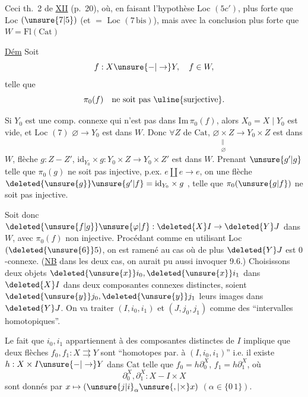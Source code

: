 

Ceci  th.~2 de \uline{XII} (p.~20),  où, en faisant l'hypothèse Loc $(5c')$, plus forte que Loc $(\unsure{7|5})$ (et $=$ Loc $(7\,\mathrm{bis})$), mais avec la conclusion plus forte que $W=\mathrm{Fl}(\mathrm{Cat})$

\uline{Dém} Soit
\[
 f:X\unsure{-|\to}Y,\quad f\in W,
\]
telle que
\[
 \pi_0(f)\quad\text{ne soit pas \uline{surjective}.}
\]

 Si $Y_0$ est une comp. connexe qui n'est pas dans $\mathrm{Im}\,\pi_0(f)$, alors $X_0=X\mid Y_0$ est vide, et  Loc $(7)$ $\varnothing\to Y_0$ est dans $W$. Donc $\forall Z$ de $\mathrm{Cat}$, $\underset{\substack{\|\\\varnothing}}{\varnothing\times Z}\longrightarrow Y_0\times Z$ est dans $W$,   flèche $g:Z-Z'$, $\mathrm{id}_{Y_0}\times g:Y_0\times Z\to Y_0\times Z'$ est dans $W$. Prenant $\unsure{g'|g}$ telle que $\pi_0(g)$ ne soit pas injective, p.ex. $e\amalg e\to e$, on  une flèche $\deleted{\unsure{g}}\unsure{g'|f}=\mathrm{id}_{Y_0}\times g$ , telle que $\pi_0(\unsure{g|f})$ ne soit pas injective.

Soit donc $\deleted{\unsure{f|g}}\unsure{\varphi|f}:\deleted{X}I\to\deleted{Y}J$ dans $W$, avec $\pi_0(f)$ non injective. Procédant comme  en utilisant Loc $(\deleted{\unsure{6}}5)$, on est ramené au cas où de plus $\deleted{Y}J$ est $0$-connexe. (\uline{NB} dans les deux cas, on aurait pu aussi invoquer 9.6.)  Choisissons deux objets $\deleted{\unsure{x}}i_0,\deleted{\unsure{x}}i_1$ dans $\deleted{X}I$ dans deux composantes connexes distinctes, soient $\deleted{\unsure{y}}j_0,\deleted{\unsure{y}}j_1$ leurs images dans $\deleted{Y}J$. On va traiter $(I,i_0,i_1)$ et $(J,j_0,j_1)$ comme des ``intervalles homotopiques''.

Le fait que $i_0,i_1$ appartiennent à des composantes distinctes de $I$ implique que deux flèches $f_0,f_1:X\rightrightarrows Y$ sont ``homotopes par. à $(I,i_0,i_1)$'' i.e. il existe $h:X\times I\unsure{-|\to}Y$ dans $\mathrm{Cat}$ telle que $f_0=h\partial_0^X$, $f_1=h\partial_1^X$, où
\[
 \partial_0^X,\partial_1^X:X-I\times X
\]
sont donnés par $x\mapsto(\unsure{j|i}_\alpha\unsure{,|\times}x)$ $(\alpha\in\{0\,1\})$.

